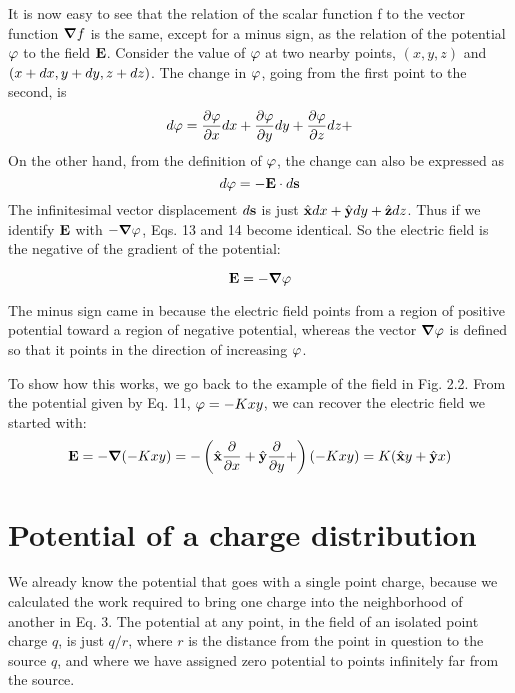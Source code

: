 It is now easy to see that the relation of the scalar function f to the
vector function $\boldsymbol{\nabla} f$ is the same, except for a minus sign, as the relation
of the potential $\varphi$ to the field $\mathbf{E}$. Consider the value of $\varphi$ at two nearby
points, $(x,y,z)$ and $(x + d x, y + d y, z + d z)$. The change in $\varphi$, going
from the first point to the second, is
\begin{equation}
  d \varphi = \frac{\partial\varphi}{\partial x} d x 
            + \frac{\partial\varphi}{\partial y} d y
            + \frac{\partial\varphi}{\partial z} d z + 
\end{equation}
On the other hand, from the definition of $\varphi$, the change can also be
expressed as
\begin{equation}
  d\varphi = -\mathbf{E}\cdot d\mathbf{s}
\end{equation}
The infinitesimal vector displacement $d\mathbf{s}$ is just $\hat{\mathbf{x}}d x+\hat{\mathbf{y}}d y+\hat{\mathbf{z}}d z$.
Thus if we identify $\mathbf{E}$ with $-\boldsymbol{\nabla}\varphi$, Eqs. 13 and 14 become identical. So
the electric field is the negative of the gradient of the potential:
\begin{framed}
\begin{equation}
  \mathbf{E}=-\boldsymbol{\nabla}\varphi
\end{equation}
\end{framed}
\noindent The minus sign came in because the electric field points from a region
of positive potential toward a region of negative potential, whereas
the vector $\boldsymbol{\nabla}\varphi$ is defined so that it points in the direction of increasing
$\varphi$.

To show how this works, we go back to the example of the field in
Fig. 2.2. From the potential given by Eq. 11, $\varphi = -Kxy$, we can
recover the electric field we started with:
\begin{equation}
  \mathbf{E} = -\boldsymbol{\nabla}(-Kxy)
         =-\left(\hat{\mathbf{x}}\frac{\partial}{\partial x}+\hat{\mathbf{y}}\frac{\partial}{\partial y}+\right)(-Kxy)
         =K(\hat{\mathbf{x}} y+\hat{\mathbf{y}} x)
\end{equation}

\section{Potential of a charge distribution}

We already know the potential that goes with a single point charge,
because we calculated the work required to bring one charge into the
neighborhood of another in Eq. 3. The potential at any point, in the
field of an isolated point charge $q$, is just $q/r$, where $r$ is the distance
from the point in question to the source $q$, and where we have
assigned zero potential to points infinitely far from the source.

